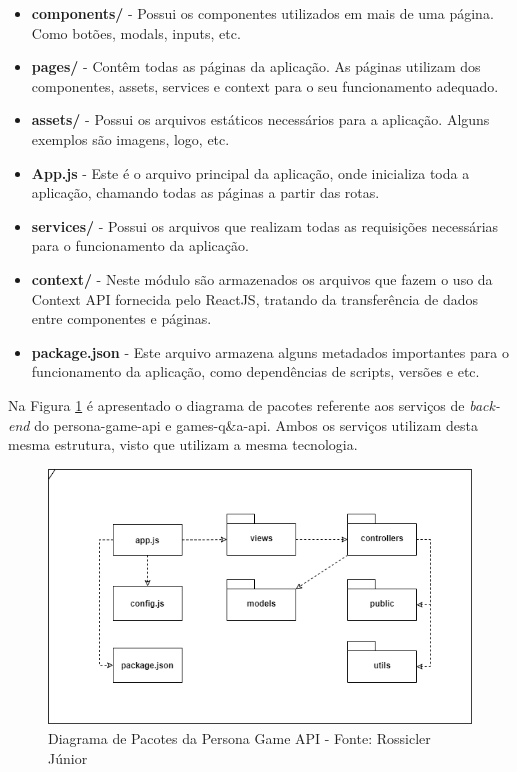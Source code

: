 {\begin{itemize}
    \item \textbf{components/} - Possui os componentes utilizados em mais de uma página. Como botões, modals, inputs, etc.
    \item \textbf{pages/} - Contêm todas as páginas da aplicação. As páginas utilizam dos componentes, assets, services e context para o seu funcionamento adequado.
    \item \textbf{assets/} - Possui os arquivos estáticos necessários para a aplicação. Alguns exemplos são imagens, logo, etc.
    \item \textbf{App.js} - Este é o arquivo principal da aplicação, onde inicializa toda a aplicação, chamando todas as páginas a partir das rotas.
    \item \textbf{services/} - Possui os arquivos que realizam todas as requisições necessárias para o funcionamento da aplicação.
    \item \textbf{context/} - Neste módulo são armazenados os arquivos que fazem o uso da Context API fornecida pelo ReactJS, tratando da transferência de dados entre componentes e páginas.
    \item \textbf{package.json} - Este arquivo armazena alguns metadados importantes para o funcionamento da aplicação, como dependências de scripts, versões e etc.
\end{itemize}

Na Figura \ref{Fig:diagrama_pacotes_api.png} é apresentado o diagrama de pacotes referente aos serviços de \textit{back-end} do persona-game-api e games-q\&a-api. Ambos os serviços utilizam desta mesma estrutura, visto que utilizam a mesma tecnologia.

\begin{figure}[htbp]
	\centering
		\includegraphics[keepaspectratio=true,scale=0.56]{figuras/arquitetura/diagrama_pacotes_backend.png}
		\caption{\textcolor{textadded}{Diagrama de Pacotes da Persona Game API - Fonte: Rossicler Júnior}}
	\label{Fig:diagrama_pacotes_api.png}
\end{figure}

}
